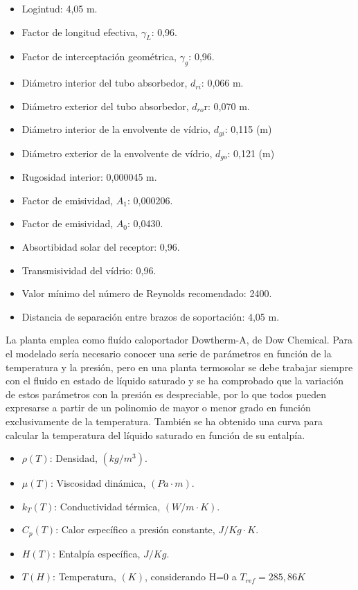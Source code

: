 \documentclass[11pt]{article}
\providecommand{\tightlist}{%
      \setlength{\itemsep}{0pt}\setlength{\parskip}{0pt}}
\begin{document}
\begin{itemize}
\tightlist
\item
  Logintud: 4,05 m.
\item
  Factor de longitud efectiva, \(\gamma_L\): 0,96.
\item
  Factor de interceptación geométrica, \(\gamma_g\): 0,96.
\item
  Diámetro interior del tubo absorbedor, \(d_{ri}\): 0,066 m.
\item
  Diámetro exterior del tubo absorbedor, \(d_{ro}\)r: 0,070 m.
\item
  Diámetro interior de la envolvente de vídrio, \(d_{gi}\): 0,115 (m)
\item
  Diámetro exterior de la envolvente de vídrio, \(d_{go}\): 0,121 (m)
\item
  Rugosidad interior: 0,000045 m.
\item
  Factor de emisividad, \(A_1\): 0,000206.
\item
  Factor de emisividad, \(A_0\): 0,0430.
\item
  Absortibidad solar del receptor: 0,96.
\item
  Transmisividad del vídrio: 0,96.
\item
  Valor mínimo del número de Reynolds recomendado: 2400.
\item
  Distancia de separación entre brazos de soportación: 4,05 m.
\end{itemize}

La planta emplea como fluído caloportador Dowtherm-A, de Dow Chemical.
Para el modelado sería necesario conocer una serie de parámetros en
función de la temperatura y la presión, pero en una planta termosolar se
debe trabajar siempre con el fluido en estado de líquido saturado y se
ha comprobado que la variación de estos parámetros con la presión es
despreciable, por lo que todos pueden expresarse a partir de un
polinomio de mayor o menor grado en función exclusivamente de la
temperatura. También se ha obtenido una curva para calcular la
temperatura del líquido saturado en función de su entalpía.

\begin{itemize}
\tightlist
\item
  \(\rho(T)\): Densidad, \((kg/m^3)\).
\item
  \(\mu(T)\): Viscosidad dinámica, \((Pa \cdot m)\).
\item
  \(k_T(T)\): Conductividad térmica, \((W/m \cdot K)\).
\item
  \(C_p(T)\): Calor específico a presión constante, \(J/Kg\cdot K\).
\item
  \(H(T)\): Entalpía específica, \(J/Kg\).
\item
  \(T(H)\): Temperatura, \((K)\), considerando H=0 a
  \(T_{ref}= 285,86 K\)
\end{itemize}
\end{document}
